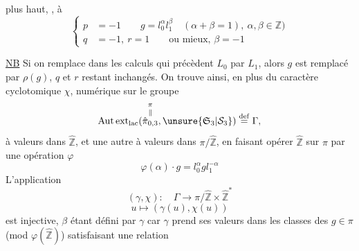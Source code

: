 plus haut,  ,   à
\[
\left\{\begin{aligned}
p&=-1\qquad g=l_0^\alpha l_1^\beta\quad(\alpha+\beta=1),\ \alpha,\beta\in\mathbb Z)\\
q&=-1,\ r=1\qquad\text{ou mieux, }\beta=-1
\end{aligned}\right.
\]

\uline{NB} Si on remplace dans les calculs qui précèdent $L_0$ par $L_1$, alors $g$ est remplacé par $\rho(g)$, $q$ et $r$ restant inchangés. On trouve ainsi, en plus du caractère cyclotomique $\chi$,    numérique \inserted{\uline{$\beta$},} sur le groupe
\[
\operatorname{Aut\,ext}_{\mathrm{lac}}(\overset{\pi}{\overset{\Vert}{\hat\pi_{0,3}}},\unsure{\mathfrak S_3|\mathcal S_3})\overset{\mathrm{def}}=\Gamma,
\]
 à valeurs dans $\hat{\mathbb Z}$, et une autre \inserted{$\gamma$} à valeurs dans $\pi/\hat{\mathbb Z}$, en faisant opérer $\hat{\mathbb Z}$ sur $\pi$ par une opération $\varphi$
\[
\varphi(\alpha)\cdot g=l_0^\alpha gl_1^{-\alpha}
\]
L'application
\[
(\gamma,\chi):\quad\Gamma\longrightarrow\pi/\hat{\mathbb Z}\times\hat{\mathbb Z}^{*}
\]
\[
u\longmapsto(\gamma(u),\chi(u))
\]
est injective,  $\beta$ étant défini par $\gamma$ car $\gamma$ prend ses valeurs dans les classes des $g\in\pi$ (mod $\varphi(\hat{\mathbb Z})$) satisfaisant une relation
